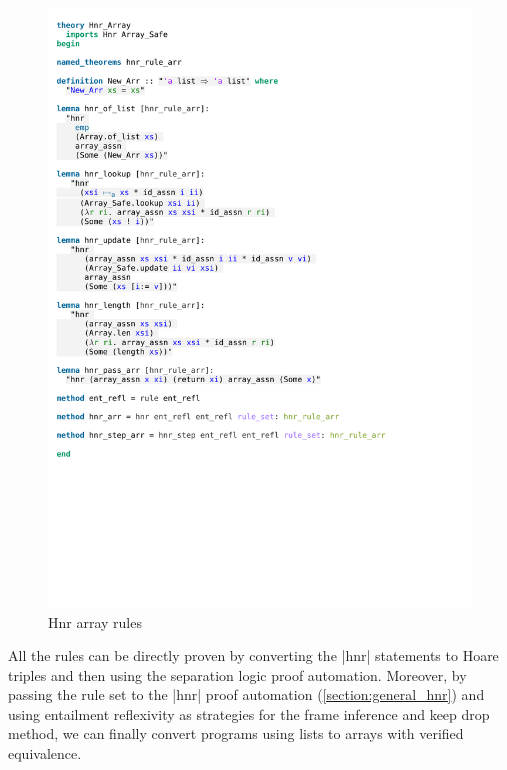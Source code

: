 \begin{figure}[htpb]
    \includegraphics[trim={0 11cm 0 8cm}, clip, width=1.00\textwidth]{figures/Theory_Hnr_Array.pdf}
    \caption[Hnr array rules]{Hnr array rules}
    \label{fig:hnr_array_rules}
\end{figure}

\noindent All the rules can be directly proven by converting the |hnr| statements to Hoare triples and then using the separation logic proof automation. Moreover, by passing the rule set to the |hnr| proof automation (\autoref{section:general_hnr}) and using entailment reflexivity as strategies for the frame inference and keep drop method, we can finally convert programs using lists to arrays with verified equivalence.


